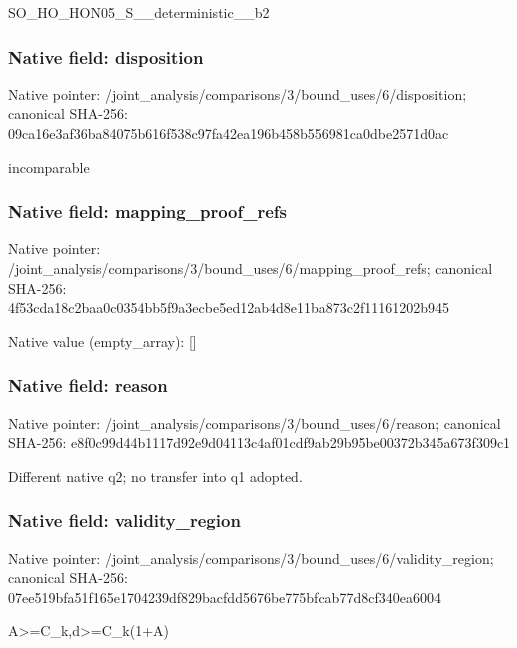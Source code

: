 \documentclass[10pt,a4paper]{article}
\begin{document}
\begingroup\raggedright\sloppy SO\_\allowbreak{}HO\_\allowbreak{}HON05\_\allowbreak{}S\_\allowbreak{}\_\allowbreak{}deterministic\_\allowbreak{}\_\allowbreak{}b2\par\endgroup

\subsubsection{Native field: disposition}
Native pointer: /joint\_\allowbreak{}analysis/comparisons/3/bound\_\allowbreak{}uses/6/disposition; canonical SHA-256: 09ca16e3af36ba84075b616f538c97fa42ea196b458b556981ca0dbe2571d0ac

\begingroup\raggedright\sloppy incomparable\par\endgroup

\subsubsection{Native field: mapping\_\allowbreak{}proof\_\allowbreak{}refs}
Native pointer: /joint\_\allowbreak{}analysis/comparisons/3/bound\_\allowbreak{}uses/6/mapping\_\allowbreak{}proof\_\allowbreak{}refs; canonical SHA-256: 4f53cda18c2baa0c0354bb5f9a3ecbe5ed12ab4d8e11ba873c2f11161202b945

Native value (empty\_\allowbreak{}array): []

\subsubsection{Native field: reason}
Native pointer: /joint\_\allowbreak{}analysis/comparisons/3/bound\_\allowbreak{}uses/6/reason; canonical SHA-256: e8f0c99d44b1117d92e9d04113c4af01cdf9ab29b95be00372b345a673f309c1

\begingroup\raggedright\sloppy Different native q2;\allowbreak{} no transfer into q1 adopted.\par\endgroup

\subsubsection{Native field: validity\_\allowbreak{}region}
Native pointer: /joint\_\allowbreak{}analysis/comparisons/3/bound\_\allowbreak{}uses/6/validity\_\allowbreak{}region; canonical SHA-256: 07ee519bfa51f165e1704239df829bacfdd5676be775bfcab77d8cf340ea6004

\begingroup\raggedright\sloppy A>=\allowbreak{}C\_\allowbreak{}k,\allowbreak{}d>=\allowbreak{}C\_\allowbreak{}k(1+A)\par\endgroup
\end{document}
